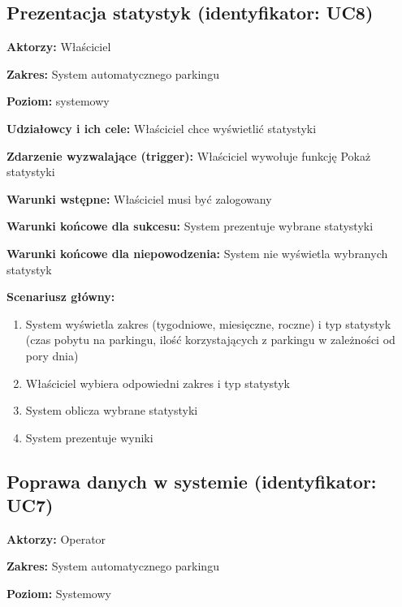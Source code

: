 \subsection{Prezentacja statystyk (identyfikator: UC8)}
\textbf{Aktorzy: }Właściciel

\hspace{0cm}\textbf{Zakres: }System automatycznego parkingu

\hspace{0cm}\textbf{Poziom: }systemowy

\hspace{0cm}\textbf{Udziałowcy i ich cele: } Właściciel chce wyświetlić statystyki

\hspace{0cm}\textbf{Zdarzenie wyzwalające (trigger): } Właściciel wywołuje funkcję Pokaż statystyki

\hspace{0cm}\textbf{Warunki wstępne: }
Właściciel musi być zalogowany

\hspace{0cm}\textbf{Warunki końcowe dla sukcesu: } System prezentuje wybrane statystyki

\hspace{0cm}\textbf{Warunki końcowe dla niepowodzenia: } System nie wyświetla wybranych statystyk \newline

\hspace{0cm}\textbf{Scenariusz główny: }
\begin{enumerate}
\item System wyświetla zakres (tygodniowe, miesięczne, roczne) i typ statystyk (czas pobytu na parkingu, ilość korzystających z parkingu w zależności od pory dnia)
\item Właściciel wybiera odpowiedni zakres i typ statystyk
\item System oblicza wybrane statystyki
\item System prezentuje wyniki
\end{enumerate}

\subsection{Poprawa danych w systemie (identyfikator: UC7)}
\textbf{Aktorzy: }Operator

\hspace{0cm}\textbf{Zakres: }System automatycznego parkingu

\hspace{0cm}\textbf{Poziom: }Systemowy

